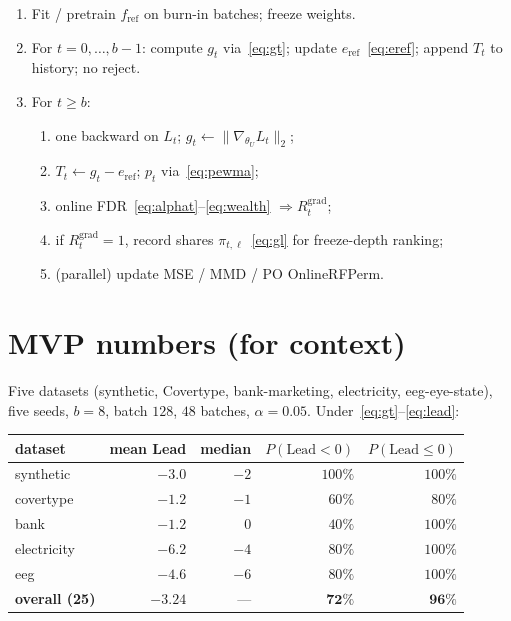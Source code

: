 \documentclass[11pt]{article}
\begin{document}
\begin{enumerate}[leftmargin=*,itemsep=0.35em]
  \item Fit / pretrain $f_{\mathrm{ref}}$ on burn-in batches; freeze weights.
  \item For $t=0,\ldots,b-1$: compute $g_t$ via~\eqref{eq:gt}; update
        $e_{\mathrm{ref}}$~\eqref{eq:eref}; append $T_t$ to history; no reject.
  \item For $t\ge b$:
  \begin{enumerate}[label=(\alph*),itemsep=0.2em]
    \item one backward on $L_t$; $g_t\leftarrow\|\nabla_{\theta_U}L_t\|_2$;
    \item $T_t\leftarrow g_t-e_{\mathrm{ref}}$; $p_t$ via~\eqref{eq:pewma};
    \item online FDR~\eqref{eq:alphat}--\eqref{eq:wealth} $\Rightarrow R_t^{\mathrm{grad}}$;
    \item if $R_t^{\mathrm{grad}}=1$, record shares $\pi_{t,\ell}$~\eqref{eq:gl}
          for freeze-depth ranking;
    \item (parallel) update MSE / MMD / PO OnlineRFPerm.
  \end{enumerate}
\end{enumerate}

\section{MVP numbers (for context)}
\label{sec:mvp}

Five datasets (synthetic, Covertype, bank-marketing, electricity,
eeg-eye-state), five seeds, $b=8$, batch $128$, $48$ batches, $\alpha=0.05$.
Under~\eqref{eq:gt}--\eqref{eq:lead}:
\begin{center}
\begin{tabular}{lrrrr}
\toprule
dataset & mean Lead & median & $P(\mathrm{Lead}<0)$ & $P(\mathrm{Lead}\le 0)$ \\
\midrule
synthetic   & $-3.0$ & $-2$ & $100\%$ & $100\%$ \\
covertype   & $-1.2$ & $-1$ & $60\%$  & $80\%$ \\
bank        & $-1.2$ & $0$  & $40\%$  & $100\%$ \\
electricity & $-6.2$ & $-4$ & $80\%$  & $100\%$ \\
eeg         & $-4.6$ & $-6$ & $80\%$  & $100\%$ \\
\midrule
\textbf{overall (25)} & $\mathbf{-3.24}$ & --- & $\mathbf{72\%}$ & $\mathbf{96\%}$ \\
\bottomrule
\end{tabular}
\end{center}
\end{document}
